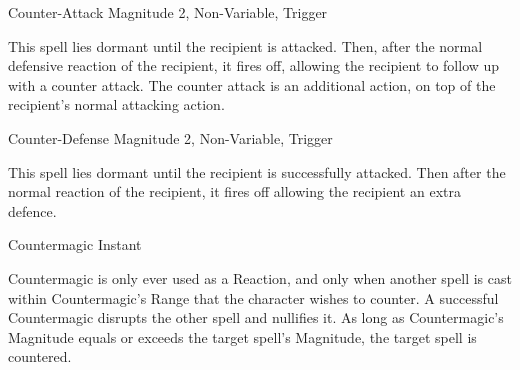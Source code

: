 \begin{rpg-spell}
{Counter-Attack}
{Magnitude 2, Non-Variable, Trigger}

This spell lies dormant until the recipient is attacked. Then, after the normal defensive reaction of the recipient, it fires off, allowing the recipient to follow up with a counter attack. The counter attack is an additional action, on top of the recipient’s normal attacking action.
\end{rpg-spell}


\begin{rpg-spell}
{Counter-Defense}
{Magnitude 2, Non-Variable, Trigger}

This spell lies dormant until the recipient is successfully attacked. Then after the normal reaction of the recipient, it fires off allowing the recipient an extra defence.
\end{rpg-spell}



\begin{rpg-spell}
{Countermagic}
{Instant}

Countermagic is only ever used as a Reaction, and only when another spell is cast within Countermagic’s Range that the character wishes to counter. A successful Countermagic disrupts the other spell and nullifies it. As long as Countermagic’s Magnitude equals or exceeds the target spell’s Magnitude, the target spell is countered.
\end{rpg-spell}


%


